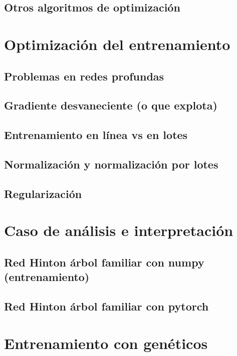 \documentclass[12pt,openany]{book}
\begin{document}
\section{Otros algoritmos de optimización}

\chapter{Optimización del entrenamiento} 
\section{Problemas en redes profundas}
\section{Gradiente desvaneciente (o que explota) }
\section{Entrenamiento en línea vs en lotes}
\section{Normalización y normalización por lotes}
\section{Regularización}

\chapter{Caso de análisis e interpretación}

\section{Red Hinton árbol familiar con numpy (entrenamiento)}

\section{Red Hinton árbol familiar con pytorch}

\chapter{Entrenamiento con genéticos}
\end{document}
